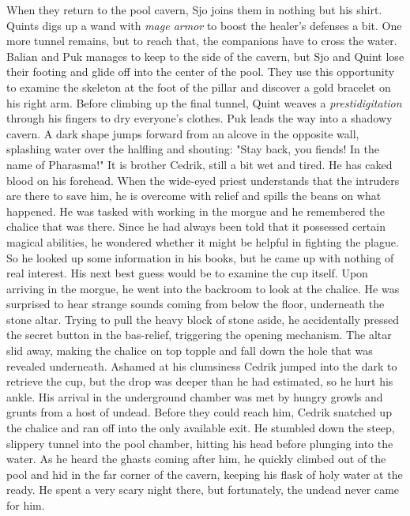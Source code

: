 When they return to the pool cavern, Sjo joins them in nothing but his shirt. Quints digs up a wand with {\itshape mage armor} to boost the healer's defenses a bit. One more tunnel remains, but to reach that, the companions have to cross the water. Balian and Puk manages to keep to the side of the cavern, but Sjo and Quint lose their footing and glide off into the center of the pool. They use this opportunity to examine the skeleton at the foot of the pillar and discover a gold bracelet on his right arm. Before climbing up the final tunnel, Quint weaves a {\itshape prestidigitation} through his fingers to dry everyone's clothes. Puk leads the way into a shadowy cavern. A dark shape jumps forward from an alcove in the opposite wall, splashing water over the halfling and shouting: "Stay back, you fiends! In the name of Pharasma!" It is brother Cedrik, still a bit wet and tired. He has caked blood on his forehead. When the wide-eyed priest understands that the intruders are there to save him, he is overcome with relief and spills the beans on what happened. He was tasked with working in the morgue and he remembered the chalice that was there. Since he had always been told that it possessed certain magical abilities, he wondered whether it might be helpful in fighting the plague. So he looked up some information in his books, but he came up with nothing of real interest. His next best guess would be to examine the cup itself. Upon arriving in the morgue, he went into the backroom to look at the chalice. He was surprised to hear strange sounds coming from below the floor, underneath the stone altar. Trying to pull the heavy block of stone aside, he accidentally pressed the secret button in the bas-relief, triggering the opening mechanism. The altar slid away, making the chalice on top topple and fall down the hole that was revealed underneath. Ashamed at his clumsiness Cedrik jumped into the dark to retrieve the cup, but the drop was deeper than he had estimated, so he hurt his ankle. His arrival in the underground chamber was met by hungry growls and grunts from a host of undead. Before they could reach him, Cedrik snatched up the chalice and ran off into the only available exit. He stumbled down the steep, slippery tunnel into the pool chamber, hitting his head before plunging into the water. As he heard the ghasts coming after him, he quickly climbed out of the pool and hid in the far corner of the cavern, keeping his flask of holy water at the ready. He spent a very scary night there, but fortunately, the undead never came for him.\\


